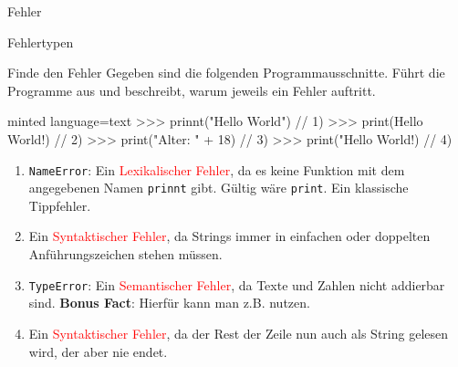 \begin{task}[points=auto]{Fehler}
\begin{subtask*}[points=0]{Fehlertypen }
\begin{solution}
        \end{solution}
    \end{subtask*}
    \begin{subtask*}[points=0]{Finde den Fehler }
        Gegeben sind die folgenden Programmausschnitte.
        Führt die Programme aus und beschreibt, warum jeweils ein Fehler auftritt.
        \begin{codeBlock}[]{minted language=text}
            >>> prinnt("Hello World")  // 1)
            >>> print(Hello World!)    // 2)
            >>> print("Alter: " + 18)  // 3)
            >>> print("Hello World!)   // 4)
        \end{codeBlock}
        \begin{solution}
            \begin{enumerate}
                \item \texttt{NameError}: Ein \textcolor{red}{Lexikalischer Fehler}, da es keine Funktion mit dem angegebenen Namen
                    \texttt{prinnt} gibt.
                    Gültig wäre \texttt{print}.
                    Ein klassische Tippfehler.
                \item Ein \textcolor{red}{Syntaktischer Fehler},
                    da Strings immer in einfachen oder doppelten Anführungszeichen stehen müssen.
                \item \texttt{TypeError}: Ein \textcolor{red}{Semantischer Fehler}, da Texte und Zahlen nicht addierbar sind.
                    \textbf{Bonus Fact}: Hierfür kann man z.B.  nutzen.
                \item Ein \textcolor{red}{Syntaktischer Fehler}, da der Rest der Zeile nun auch als String gelesen wird, der aber nie endet.
            \end{enumerate}

        \end{solution}
    \end{subtask*}
\end{task}

